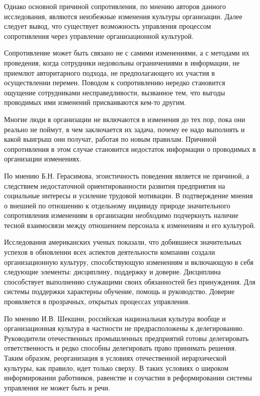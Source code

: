 Однако основной причиной сопротивления, по мнению авторов данного исследования, являются неизбежные изменения культуры организации. Далее следует вывод, что существует возможность управления процессом сопротивления через управление организационной культурой.

Сопротивление может быть связано не с самими изменениями, а с методами их проведения, когда сотрудники недовольны ограничениями в информации, не приемлют авторитарного подхода, не предполагающего их участия в осуществлении перемен. Поводом к сопротивлению нередко становится ощущение сотрудниками несправедливости, вызванное тем, что выгоды проводимых ими изменений присваиваются кем-то другим.

Многие люди в организации не включаются в изменения до тех пор, пока они реально не поймут, в чем заключается их задача, почему ее надо выполнять и какой выигрыш они получат, работая по новым правилам. Причиной сопротивления в этом случае становится недостаток информации о проводимых в организации изменениях.

По мнению Б.Н. Герасимова, эгоистичность поведения является не причиной, а следствием недостаточной ориентированности развития предприятия на социальные интересы и усиление трудовой мотивации. В подтверждение мнения о внешней по отношению к отдельному индивиду природе значительного сопротивления изменениям в организации необходимо подчеркнуть наличие тесной взаимосвязи между отношением персонала к изменениям и его культурой.

Исследования американских ученых показали, что добившиеся значительных успехов в обновлении всех аспектов деятельности компании создали организационную культуру, способствующую изменениям и включающую в себя следующие элементы: дисциплину, поддержку и доверие. Дисциплина способствует выполнению служащими своих обязанностей без принуждения. Для системы поддержки характерны обучение, помощь и руководство. Доверие проявляется в прозрачных, открытых процессах управления.

По мнению И.В. Шекшни, российская национальная культура вообще и организационная культура в частности не предрасположены к делегированию. Руководители отечественных промышленных предприятий готовы делегировать ответственность и редко способны делегировать право принимать решения. Таким образом, реорганизация в условиях отечественной иерархической культуры, как правило, идет только сверху. В таких условиях о широком информировании работников, равенстве и соучастии в реформировании системы управления не может быть и речи.

